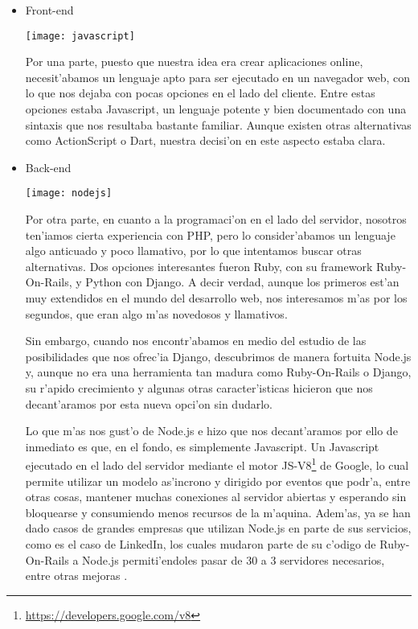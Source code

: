 \begin{itemize}
\item Front-end
\begin{center}
\texttt{[image: javascript]}
\end{center}

Por una parte, puesto que nuestra idea era crear aplicaciones online, necesit'abamos un
lenguaje apto para ser ejecutado en un navegador web, con lo que nos dejaba con pocas opciones en el lado del cliente. Entre estas
opciones estaba Javascript, un lenguaje potente y bien documentado con una sintaxis que nos resultaba bastante familiar. Aunque existen
otras alternativas como ActionScript o Dart, nuestra decisi'on en este aspecto estaba clara. 

\item Back-end
\begin{center}
\texttt{[image: nodejs]}
\end{center}

Por otra parte, en cuanto a la programaci'on en el lado del servidor, nosotros ten'iamos cierta experiencia con PHP, pero lo
consider'abamos un lenguaje algo anticuado y poco llamativo, por lo que intentamos buscar otras alternativas. Dos opciones interesantes
fueron Ruby, con su framework Ruby-On-Rails, y Python con Django. A decir verdad, aunque los primeros est'an muy extendidos en el
mundo del desarrollo web, nos interesamos m'as por los segundos, que eran algo m'as novedosos y llamativos.

Sin embargo, cuando nos encontr'abamos en medio del estudio de las posibilidades que nos ofrec'ia Django, descubrimos de manera fortuita
Node.js y, aunque no era una herramienta tan madura como Ruby-On-Rails o Django, su r'apido crecimiento y algunas otras caracter'isticas
hicieron que nos decant'aramos por esta nueva opci'on sin dudarlo.

Lo que m'as nos gust'o de Node.js e hizo que nos decant'aramos por ello de inmediato es que, en el fondo, es simplemente Javascript. Un
Javascript ejecutado en el lado del servidor mediante el motor JS-V8\footnote{\url{https://developers.google.com/v8}} de Google, lo cual permite utilizar un modelo as'incrono y dirigido
por eventos que podr'a, entre otras cosas, mantener muchas conexiones al servidor abiertas y esperando sin bloquearse y consumiendo menos
recursos de la m'aquina. Adem'as, ya se han dado casos de grandes empresas que utilizan Node.js en parte de sus servicios, como es el caso de
LinkedIn, los cuales mudaron parte de su c'odigo de Ruby-On-Rails a Node.js permiti'endoles pasar de 30 a 3 servidores necesarios, entre otras
mejoras \cite{linkedin_nodejs} .


\end{itemize}
